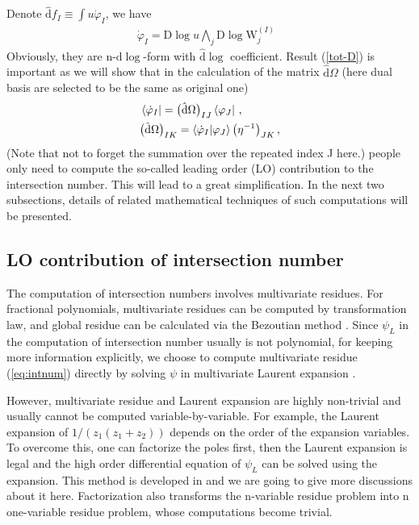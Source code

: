 \documentclass[a4paper,11pt]{article}
\newcommand{\nn}{\nonumber}
\newcommand{\nd}{\mathrm{d}}
\newcommand{\nD}{\mathrm{D}}
\newcommand{\nW}{\mathrm{W}}
\newcommand{\nds}{\hat{\mathrm{d}}}
\def\eref#1{(\ref{#1})}
\begin{document}
Denote $\nds f_I\equiv\int u \dot{\varphi}_I$, we have 
\begin{align}
\dot{\varphi}_I= \nD \log u \bigwedge_j \nD \log \nW^{(I)}_j~~~\label{tot-D}
\end{align}
Obviously, they are n-$\nd\log$-form with $\nds \log$ coefficient. Result \eref{tot-D}
is important as we will show that in the calculation of  the matrix $\nds \Omega$ (here dual basis are selected to be the same as original one)
\begin{align}
    &\bra{\dot{\varphi}_I}  = \big( \nds \Omega \big)_{IJ} \bra{\varphi_J} \,,  \nn\\
    &\big( \nds \Omega \big)_{IK} = \braket{\dot{\varphi}_I|\varphi_J} \big( \eta^{-1} \big)_{JK} \, ,
    \label{eq:intnumDE}
\end{align}
(Note that not to forget the summation over the repeated index J here.)
people only need to compute the so-called leading order (LO) contribution to the intersection number. This will lead to a great simplification. In the next two subsections,  details of related mathematical techniques of such computations will be presented.



\subsection{LO contribution of intersection number}


The computation of intersection numbers involves multivariate residues. For fractional polynomials,  multivariate residues can be computed by transformation law, and global residue can be calculated via the Bezoutian method \cite{Zhang:2016kfo, Larsen:2017aqb}. Since $\psi_L$ in the computation of intersection number usually is not polynomial,  for keeping more information explicitly,  we choose to compute multivariate residue \eref{eq:intnum} directly by solving $\psi$ in multivariate Laurent expansion \cite{Chestnov:2022xsy}.

 However, multivariate residue and Laurent expansion are highly non-trivial and usually cannot be computed variable-by-variable. For example, the Laurent expansion of $1/(z_1 (z_1+z_2))$ depends on the order of the expansion variables. %
To overcome this, one can factorize the poles first, then the Laurent expansion is legal and the high order differential equation of $\psi_L$ can be solved using the expansion. This method is developed in  \cite{Chestnov:2022xsy, Chen:2023kgw} and we are going to  give more discussions about  it here. Factorization also transforms the n-variable residue problem into n one-variable residue problem, whose computations become  trivial. 
\end{document}
